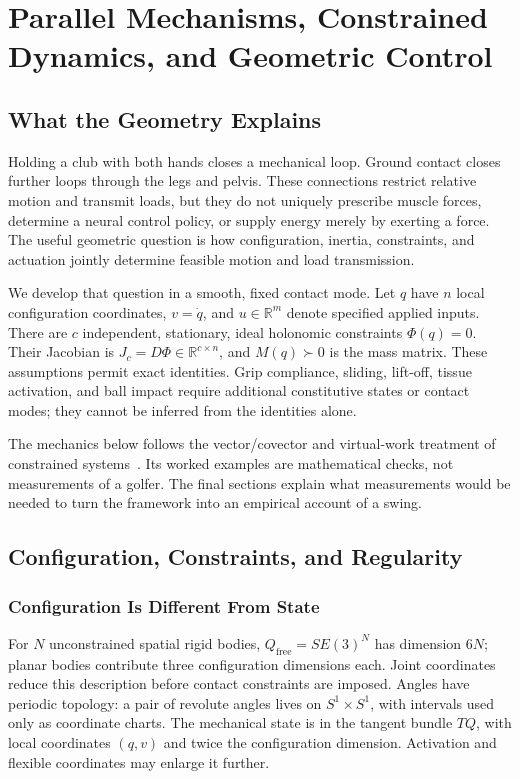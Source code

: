 \chapter{Parallel Mechanisms, Constrained Dynamics, and Geometric Control}
\label{ch:parallel-mechanisms}

\section{What the Geometry Explains}

Holding a club with both hands closes a mechanical loop. Ground contact closes further loops through the legs and pelvis. These connections restrict relative motion and transmit loads, but they do not uniquely prescribe muscle forces, determine a neural control policy, or supply energy merely by exerting a force. The useful geometric question is how configuration, inertia, constraints, and actuation jointly determine feasible motion and load transmission.

We develop that question in a smooth, fixed contact mode. Let $q$ have $n$ local configuration coordinates, $v=\dot q$, and $u\in\mathbb R^m$ denote specified applied inputs. There are $c$ independent, stationary, ideal holonomic constraints $\Phi(q)=0$. Their Jacobian is $J_c=D\Phi\in\mathbb R^{c\times n}$, and $M(q)\succ0$ is the mass matrix. These assumptions permit exact identities. Grip compliance, sliding, lift-off, tissue activation, and ball impact require additional constitutive states or contact modes; they cannot be inferred from the identities alone.

The mechanics below follows the vector/covector and virtual-work treatment of constrained systems~\cite{BulloLewis2004,Murray1994}. Its worked examples are mathematical checks, not measurements of a golfer. The final sections explain what measurements would be needed to turn the framework into an empirical account of a swing.

\section{Configuration, Constraints, and Regularity}
\label{sec:ch9:config-manifolds}

\subsection{Configuration Is Different From State}

For $N$ unconstrained spatial rigid bodies, $Q_{\mathrm{free}}=SE(3)^N$ has dimension $6N$; planar bodies contribute three configuration dimensions each. Joint coordinates reduce this description before contact constraints are imposed. Angles have periodic topology: a pair of revolute angles lives on $S^1\times S^1$, with intervals used only as coordinate charts. The mechanical state is in the tangent bundle $TQ$, with local coordinates $(q,v)$ and twice the configuration dimension. Activation and flexible coordinates may enlarge it further.

